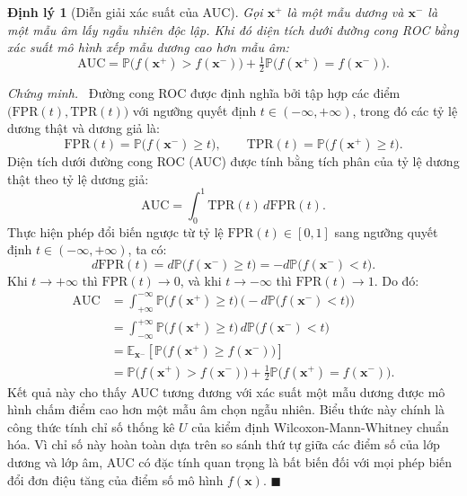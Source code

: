 \documentclass[12pt,a4paper,oneside]{report}
\theoremstyle{vnplain}
\newtheorem{dlytheo}{Định lý}[chapter]
\theoremstyle{vndef}
\renewcommand{\proofname}{Chứng minh}
\renewenvironment{proof}[1][\proofname]{\par\noindent\textit{#1.}\ }{\hfill$\blacksquare$\par\vspace{4pt}}
\newcommand{\E}{\mathbb{E}}
\newcommand{\Prob}{\mathbb{P}}
\newcommand{\xv}{\mathbf{x}}
\begin{document}
\begin{khungtheo}
\begin{dlytheo}[Diễn giải xác suất của AUC]\label{dl:auc}
Gọi $\xv^+$ là một mẫu dương và $\xv^-$ là một mẫu âm lấy ngẫu nhiên độc lập. Khi đó diện
tích dưới đường cong ROC bằng xác suất mô hình xếp mẫu dương cao hơn mẫu âm:
\begin{equation}
  \mathrm{AUC}=\Prob\big(f(\xv^+)>f(\xv^-)\big)+\tfrac12\Prob\big(f(\xv^+)=f(\xv^-)\big).
  \label{eq:auc}
\end{equation}
\end{dlytheo}
\end{khungtheo}
\begin{proof}
Đường cong ROC được định nghĩa bởi tập hợp các điểm $\big(\mathrm{FPR}(t), \mathrm{TPR}(t)\big)$ với ngưỡng quyết định $t \in (-\infty, +\infty)$, trong đó các tỷ lệ dương thật và dương giả là:
\[
  \mathrm{FPR}(t) = \Prob\big(f(\xv^-) \ge t\big), \qquad \mathrm{TPR}(t) = \Prob\big(f(\xv^+) \ge t\big).
\]
Diện tích dưới đường cong ROC (AUC) được tính bằng tích phân của tỷ lệ dương thật theo tỷ lệ dương giả:
\[
  \mathrm{AUC} = \int_{0}^{1} \mathrm{TPR}(t) \, d\mathrm{FPR}(t).
\]
Thực hiện phép đổi biến ngược từ tỷ lệ $\mathrm{FPR}(t) \in [0, 1]$ sang ngưỡng quyết định $t \in (-\infty, +\infty)$, ta có:
\[
  d\mathrm{FPR}(t) = d\Prob\big(f(\xv^-) \ge t\big) = -d\Prob\big(f(\xv^-) < t\big).
\]
Khi $t \to +\infty$ thì $\mathrm{FPR}(t) \to 0$, và khi $t \to -\infty$ thì $\mathrm{FPR}(t) \to 1$. Do đó:
\begin{align*}
  \mathrm{AUC} &= \int_{+\infty}^{-\infty} \Prob\big(f(\xv^+) \ge t\big) \, \Big(-d\Prob\big(f(\xv^-) < t\big)\Big) \\
  &= \int_{-\infty}^{+\infty} \Prob\big(f(\xv^+) \ge t\big) \, d\Prob\big(f(\xv^-) < t\big) \\
  &= \E_{\xv^-} \left[ \Prob\big(f(\xv^+) \ge f(\xv^-)\big) \right] \\
  &= \Prob\big(f(\xv^+) > f(\xv^-)\big) + \tfrac{1}{2}\Prob\big(f(\xv^+) = f(\xv^-)\big).
\end{align*}
Kết quả này cho thấy AUC tương đương với xác suất một mẫu dương được mô hình chấm điểm cao hơn một mẫu âm chọn ngẫu nhiên. Biểu thức này chính là công thức tính chỉ số thống kê $U$ của kiểm định Wilcoxon-Mann-Whitney chuẩn hóa. Vì chỉ số này hoàn toàn dựa trên so sánh thứ tự giữa các điểm số của lớp dương và lớp âm, AUC có đặc tính quan trọng là bất biến đối với mọi phép biến đổi đơn điệu tăng của điểm số mô hình $f(\xv)$.
\end{proof}
\end{document}
